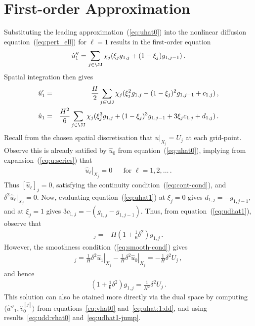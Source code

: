 \documentclass[12pt,a5paper]{article}
\begin{document}
\section{First-order Approximation}\label{sec:first-order}
Substituting the leading approximation~(\ref{eq:uhat0}) into the
nonlinear diffusion equation~(\ref{eq:pert_ell}) for $\ell=1$ results in
the first-order equation
\begin{eqnarray}
\hat{u}''_1 = \sum_{j\in\JJ}\chi_j(\xi_j g_{1,j}+(1-\xi_j)g_{1,j-1})\,.
\label{eq:uhat:1:dd}
\end{eqnarray}
Spatial integration then gives
\begin{eqnarray}
\hat{u}'_1 & = & \frac{H}{2}\sum_{j\in\JJ}\chi_j(\xi^2_j g_{1,j}
-(1-\xi_j)^2g_{1,j-1}+c_{1,j})\,,
\label{eq:udhat1}
\\
\hat{u}_1 & = & \frac{H^2}{6}\sum_{j\in\JJ}\chi_j(\xi^3_j g_{1,j}
+(1-\xi_j)^3g_{1,j-1}+3\xi_{j}c_{1,j}+d_{1,j})\,.
\label{eq:uhat1}
\end{eqnarray}
Recall from the chosen  spatial discretisation that $u|_{X_j}=U_{j}$ at each grid-point.
Observe this is already satified by $\hat{u}_0$ from equation~(\ref{eq:uhat0}), implying
from expansion~(\ref{eq:u:series}) that
\begin{eqnarray}
\left.\hat{u}_\ell\right|_{X_j}=0 && \mbox{for }\ell=1,2,\ldots\,.
\label{eq:u_ell_fixed}
\end{eqnarray}
Thus $[\hat{u}_\ell]_j=0$, satisfying the continuity 
condition~(\ref{eq:cont-cond}), and $\delta^2\hat{u}_\ell|_{X_j}=0$.
Now, evaluating equation~(\ref{eq:uhat1}) at $\xi_j=0$ gives $d_{1,j}=-g_{1,j-1}$,
and at $\xi_j=1$ gives $3c_{1,j}=-(g_{1,j}-g_{1,j-1})$.
Thus,  from equation~(\ref{eq:udhat1}), observe that
\begin{eqnarray}
[\hat{u}'_1]_j = -H\left(1+\frac{1}{6}\delta^2\right)g_{1,j}\,.
\end{eqnarray}
However, the smoothness condition~(\ref{eq:smooth-cond}) gives
\begin{eqnarray}
   [\hat{u}'_1]_j = 
\frac{1}{H}\left.\delta^{2}\hat{u}_1\right|_{X_j}
-\frac{1}{H}\left.\delta^{2}\hat{u}_0\right|_{X_j}
= -\frac{1}{H}\delta^{2}U_j\,,
\label{eq:udhat1-jump}
\end{eqnarray}
and hence
\begin{eqnarray}
\left(1+\frac{1}{6}\delta^2\right)g_{1,j} = \frac{1}{H^2}\delta^2U_j\,.
\label{eq:g1}
\end{eqnarray}
This solution can also be otained more directly via the dual space by computing $\langle\hat{u}''_1,\hat{v}_0^{[j]}\rangle$ from
equations~\eqref{eq:vhat0} and~\eqref{eq:uhat:1:dd}, and using results~\eqref{eq:udd:vhat0} and~\eqref{eq:udhat1-jump}.
\end{document}
